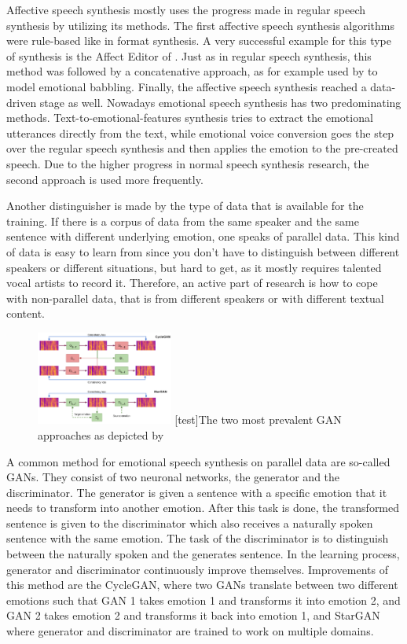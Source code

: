 \documentclass[11pt]{article}
\begin{document}
Affective speech synthesis mostly uses the progress made in regular speech synthesis by utilizing its methods. The first affective speech synthesis algorithms were rule-based like in format synthesis. A very successful example for this type of synthesis is the Affect Editor of \cite{cahn_generation_nodate}. Just as in regular speech synthesis, this method was followed by a concatenative approach, as for example used by \cite{pierre-yves_production_2003} to model emotional babbling. Finally, the affective speech synthesis reached a data-driven stage as well.
Nowadays emotional speech synthesis has two predominating methods. Text-to-emotional-features synthesis tries to extract the emotional utterances directly from the text, while emotional voice conversion goes the step over the regular speech synthesis and then applies the emotion to the pre-created speech. Due to the higher progress in normal speech synthesis research, the second approach is used more frequently.

Another distinguisher is made by the type of data that is available for the training. If there is a corpus of data from the same speaker and the same sentence with different underlying emotion, one speaks of parallel data. This kind of data is easy to learn from since you don’t have to distinguish between different speakers or different situations, but hard to get, as it mostly requires talented vocal artists to record it. Therefore, an active part of research is how to cope with non-parallel data, that is from different speakers or with different textual content.

\begin{figure}[h]
 \centering
\includegraphics[width=0.4\textwidth]{"Bilder/GAN.PNG"}
[test]{The two most prevalent GAN approaches as depicted by \cite{triantafyllopoulos_overview_2023}}
\end{figure}

A common method for emotional speech synthesis on parallel data are so-called GANs. They consist of two neuronal networks, the generator and the discriminator. The generator is given a sentence with a specific emotion that it needs to transform into another emotion. After this task is done, the transformed sentence is given to the discriminator which also receives a naturally spoken sentence with the same emotion. The task of the discriminator is to distinguish between the naturally spoken and the generates sentence. In the learning process, generator and discriminator continuously improve themselves. Improvements of this method are the CycleGAN, where two GANs translate between two different emotions such that GAN 1 takes emotion 1 and transforms it into emotion 2, and GAN 2 takes emotion 2 and transforms it back into emotion 1, and StarGAN where generator and discriminator are trained to work on multiple domains.
\end{document}

